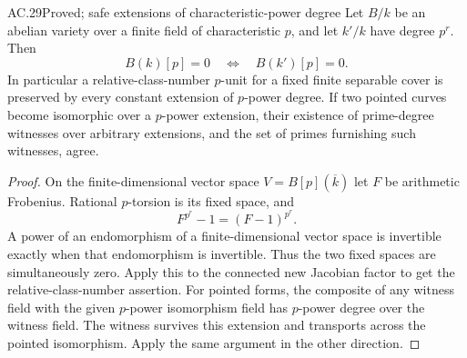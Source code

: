 \begin{claim}{AC.29}{Proved; safe extensions of characteristic-power degree}
Let $B/k$ be an abelian variety over a finite field of characteristic
$p$, and let $k'/k$ have degree $p^r$. Then
\[
 B(k)[p]=0\quad\Longleftrightarrow\quad B(k')[p]=0.
\]
In particular a relative-class-number $p$-unit for a fixed finite
separable cover is preserved by every constant extension of
$p$-power degree.
If two pointed curves become isomorphic over a $p$-power extension,
their existence of prime-degree witnesses over arbitrary extensions,
and the set of primes furnishing such witnesses, agree.
\end{claim}
\begin{proof}
On the finite-dimensional vector space
$V=B[p](\overline k)$ let $F$ be arithmetic Frobenius.
Rational $p$-torsion is its fixed space, and
\[
                     F^{p^r}-1=(F-1)^{p^r}.
\]
A power of an endomorphism of a finite-dimensional vector space
is invertible exactly when that endomorphism is invertible.
Thus the two fixed spaces are simultaneously zero.
Apply this to the connected new Jacobian factor to get the
relative-class-number assertion.
For pointed forms, the composite of any witness field with the
given $p$-power isomorphism field has $p$-power degree over the
witness field. The witness survives this extension and transports
across the pointed isomorphism. Apply the same argument in the
other direction.
\end{proof}


